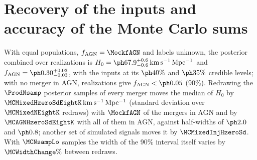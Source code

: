 \documentclass[aps,prd,reprint,superscriptaddress,nofootinbib]{revtex4-2}
\newcommand{\kms}{\,{\rm km\,s^{-1}\,Mpc^{-1}}}
\newcommand{\fagn}{f_{\rm AGN}}
\begin{document}
\section{Recovery of the inputs and accuracy of the Monte Carlo sums}
\label{app:checks}

With equal populations, $\fagn=\MockfAGN$ and labels unknown, the posterior combined over
\NrealKnown{} realizations is $H_0=\IndRecHzeroComb\kms$ and $\fagn=\IndRecfAGNComb$, with the
inputs at its $\IndRecHzeroCL\%$ and $\IndRecfAGNCL\%$ credible levels; with no merger in AGN,
\NrealCtrl{} realizations give $\fagn<\IndZerofAGNUL$ (90\%). %
Redrawing the $\ProdNsamp$ posterior samples of every merger moves the median of $H_0$ by
$\MCMixedHzeroSdEightK\kms$ (standard deviation over $\MCMixedNEightK$ redraws) with $\MockfAGN$
of the mergers in AGN and by $\MCAGNHzeroSdEightK$ with all of them in AGN, against half-widths
of $\IndHWMix$ and $\IndHWAGN$; another set of simulated signals moves it by
$\MCMixedInjHzeroSd$. %
With $\MCNsampLo$ samples the width of the 90\% interval itself varies by $\MCWidthChange\%$
between redraws.


\end{document}
